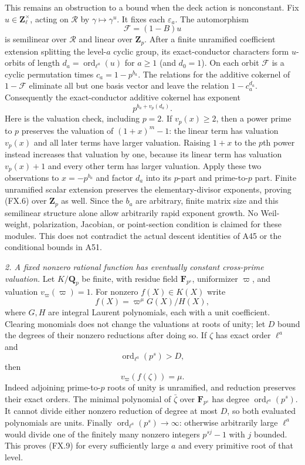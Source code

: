 \documentclass[11pt,a4paper]{article}
\begin{document}
This remains an obstruction to a bound when the deck action is
nonconstant. Fix $u\in\mathbf Z_\ell^\times$, acting on $\mathcal R$
by $\gamma\mapsto\gamma^u$. It fixes each $\varepsilon_a$.
The automorphism
\[
           \mathcal F=(1-B)u
 \tag{FX.5}
\]
is semilinear over $\mathcal R$ and linear over $\mathbf Z_p$.
After a finite unramified coefficient extension splitting the
level-$a$ cyclic group, its exact-conductor characters form $u$-orbits
of length $d_a=\operatorname{ord}_{\ell^a}(u)$ for $a\ge1$
(and $d_0=1$). On each orbit
$\mathcal F$ is a cyclic permutation times $c_a=1-p^{b_a}$.
The relations for the additive cokernel of $1-\mathcal F$ eliminate
all but one basis vector and leave the relation
$1-c_a^{d_a}$. Consequently the exact-conductor additive cokernel
has exponent
\[
          p^{b_a+v_p(d_a)}.
 \tag{FX.6}
\]
Here is the valuation check, including $p=2$. If $v_p(x)\ge2$,
then a power prime to $p$ preserves the valuation of $(1+x)^m-1$:
the linear term has valuation $v_p(x)$ and all later terms have
larger valuation. Raising $1+x$ to the $p$th power instead increases
that valuation by one, because its linear term has valuation
$v_p(x)+1$ and every other term has larger valuation. Apply these
two observations to $x=-p^{b_a}$ and factor $d_a$ into its $p$-part
and prime-to-$p$ part. Finite unramified scalar extension preserves
the elementary-divisor exponents, proving (FX.6) over $\mathbf Z_p$
as well. Since the $b_a$ are arbitrary, finite matrix size and this
semilinear structure alone allow arbitrarily rapid exponent growth.
No Weil-weight, polarization, Jacobian, or point-section condition
is claimed for these modules. This does not contradict the actual
descent identities of A45 or the conditional bounds in A51.

\emph{2. A fixed nonzero rational function has eventually constant
cross-prime valuation.}
Let $K/\mathbf Q_p$ be finite, with residue field
$\mathbf F_{p^s}$, uniformizer $\varpi$, and valuation
$v_\varpi(\varpi)=1$. For nonzero $f(X)\in K(X)$ write
\[
             f(X)=\varpi^\mu G(X)/H(X),
 \tag{FX.7}
\]
where $G,H$ are integral Laurent polynomials, each with a unit
coefficient. Clearing monomials does not change the valuations
at roots of unity; let $D$ bound the degrees of their nonzero
reductions after doing so. If $\zeta$ has exact order $\ell^a$ and
\[
                  \operatorname{ord}_{\ell^a}(p^s)>D,
 \tag{FX.8}
\]
then
\[
                        v_\varpi(f(\zeta))=\mu.
 \tag{FX.9}
\]
Indeed adjoining prime-to-$p$ roots of unity is unramified, and
reduction preserves their exact orders. The minimal polynomial of
$\bar\zeta$ over $\mathbf F_{p^s}$ has degree
$\operatorname{ord}_{\ell^a}(p^s)$. It cannot divide either nonzero
reduction of degree at most $D$, so both evaluated polynomials are
units. Finally $\operatorname{ord}_{\ell^a}(p^s)\to\infty$:
otherwise arbitrarily large $\ell^a$ would divide one of the
finitely many nonzero integers $p^{sj}-1$ with $j$ bounded.
This proves (FX.9) for every sufficiently large $a$ and every
primitive root of that level.
\end{document}
